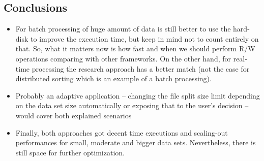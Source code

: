 \subsection{Conclusions}

\begin{itemize}
	\item For batch processing of huge amount of data is still better to use the hard-disk to improve the execution time, but keep in mind not to count entirely on that. So, what it matters now is how fast and when we should perform R/W operations comparing with other frameworks. On the other hand, for real-time processing the research approach has a better match (not the case for distributed sorting which is an example of a batch processing).
	\item Probably an adaptive application -- changing the file split size limit depending on the data set size automatically or exposing that to the user's decision -- would cover both explained scenarios
	\item Finally, both approaches got decent time executions and scaling-out performances for small, moderate and bigger data sets. Nevertheless, there is still space for further optimization. 
\end{itemize}


